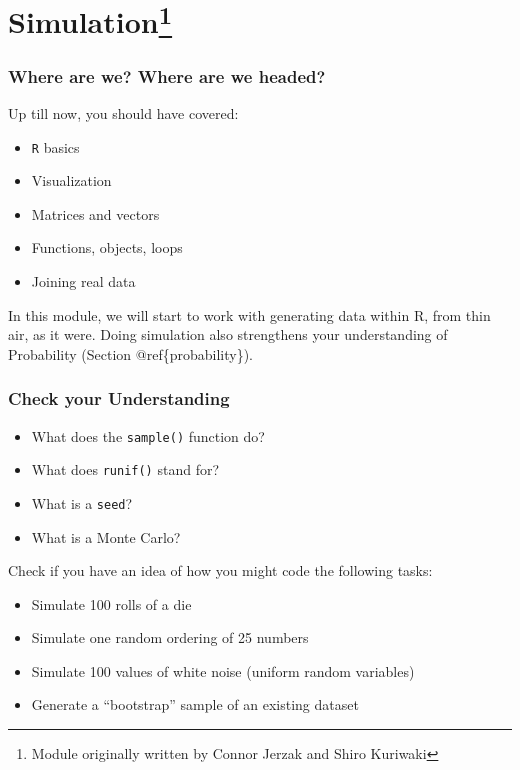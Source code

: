 \documentclass[]{book}
\providecommand{\tightlist}{%
  \setlength{\itemsep}{0pt}\setlength{\parskip}{0pt}}
\let\rmarkdownfootnote\footnote%
\def\footnote{\protect\rmarkdownfootnote}
\theoremstyle{definition}
\theoremstyle{definition}
\theoremstyle{definition}
\theoremstyle{remark}
\begin{document}
\hypertarget{simulation}{%
\chapter[Simulation]{\texorpdfstring{Simulation\footnote{Module originally written by Connor Jerzak and Shiro Kuriwaki}}{Simulation}}\label{simulation}}

\hypertarget{where-are-we-where-are-we-headed-5}{%
\subsection*{Where are we? Where are we headed?}\label{where-are-we-where-are-we-headed-5}}

Up till now, you should have covered:

\begin{itemize}
\tightlist
\item
  \texttt{R} basics
\item
  Visualization
\item
  Matrices and vectors
\item
  Functions, objects, loops
\item
  Joining real data
\end{itemize}

In this module, we will start to work with generating data within R, from thin air, as it were. Doing simulation also strengthens your understanding of Probability (Section @ref\{probability\}).

\hypertarget{check-your-understanding-2}{%
\subsection*{Check your Understanding}\label{check-your-understanding-2}}

\begin{itemize}
\tightlist
\item
  What does the \texttt{sample()} function do?
\item
  What does \texttt{runif()} stand for?
\item
  What is a \texttt{seed}?
\item
  What is a Monte Carlo?
\end{itemize}

Check if you have an idea of how you might code the following tasks:

\begin{itemize}
\tightlist
\item
  Simulate 100 rolls of a die
\item
  Simulate one random ordering of 25 numbers
\item
  Simulate 100 values of white noise (uniform random variables)
\item
  Generate a ``bootstrap'' sample of an existing dataset
\end{itemize}
\end{document}
